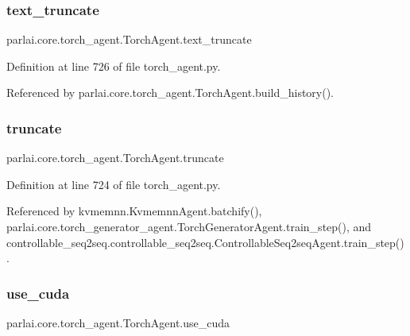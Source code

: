 \subsubsection{\texorpdfstring{text\+\_\+truncate}{text\_truncate}}
{\footnotesize\ttfamily parlai.\+core.\+torch\+\_\+agent.\+Torch\+Agent.\+text\+\_\+truncate}



Definition at line 726 of file torch\+\_\+agent.\+py.



Referenced by parlai.\+core.\+torch\+\_\+agent.\+Torch\+Agent.\+build\+\_\+history().

\mbox{\label{classparlai_1_1core_1_1torch__agent_1_1TorchAgent_a3ae27e9fe68d255a960bcb5180f48a65}} 
\subsubsection{\texorpdfstring{truncate}{truncate}}
{\footnotesize\ttfamily parlai.\+core.\+torch\+\_\+agent.\+Torch\+Agent.\+truncate}



Definition at line 724 of file torch\+\_\+agent.\+py.



Referenced by kvmemnn.\+Kvmemnn\+Agent.\+batchify(), parlai.\+core.\+torch\+\_\+generator\+\_\+agent.\+Torch\+Generator\+Agent.\+train\+\_\+step(), and controllable\+\_\+seq2seq.\+controllable\+\_\+seq2seq.\+Controllable\+Seq2seq\+Agent.\+train\+\_\+step().

\mbox{\label{classparlai_1_1core_1_1torch__agent_1_1TorchAgent_a10b8d2605e619d5d3dc9f67777cb190a}} 
\subsubsection{\texorpdfstring{use\+\_\+cuda}{use\_cuda}}
{\footnotesize\ttfamily parlai.\+core.\+torch\+\_\+agent.\+Torch\+Agent.\+use\+\_\+cuda}



